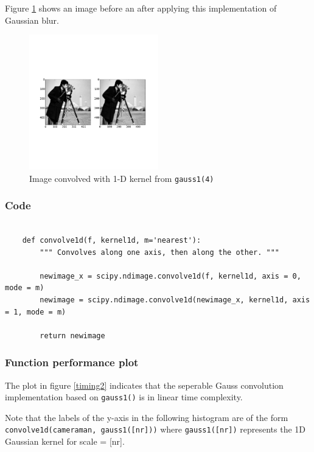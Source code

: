 \documentclass[abstract=true]{scrartcl}
\begin{document}
        Figure \ref{gauss1blur} shows an image before an after applying this
        implementation of Gaussian blur.

        \begin{figure}
          \centering
          \includegraphics[width=0.5\textwidth]{../images/gauss1d}
          \caption{Image convolved with 1-D kernel from \texttt{gauss1(4)}}
          \label{gauss1blur}
        \end{figure}

        \subsubsection{Code}

            \begin{verbatim}

    def convolve1d(f, kernel1d, m='nearest'):
        """ Convolves along one axis, then along the other. """

        newimage_x = scipy.ndimage.convolve1d(f, kernel1d, axis = 0, mode = m)    
        newimage = scipy.ndimage.convolve1d(newimage_x, kernel1d, axis = 1, mode = m)

        return newimage

            \end{verbatim}

        \subsubsection{Function performance plot}

            The plot in figure \ref{timing2} indicates that the seperable Gauss
            convolution implementation based on \texttt{gauss1()} is in linear
            time complexity. 

            Note that the labels of the y-axis in the following histogram are of
            the form \texttt{convolve1d(cameraman, gauss1([nr]))} where
            \texttt{gauss1([nr])} represents the 1D Gaussian kernel for scale =
            [nr].
        
\end{document}

